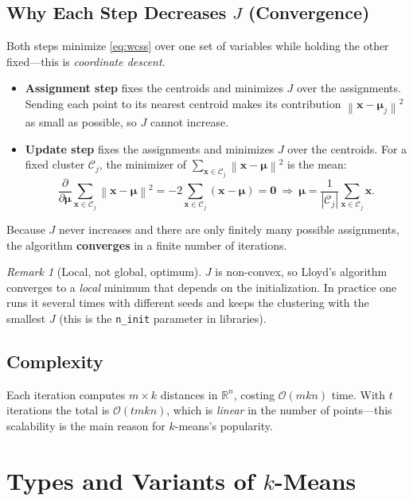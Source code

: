 \documentclass[11pt,a4paper]{report}
\theoremstyle{definition}
\theoremstyle{plain}
\theoremstyle{remark}
\newtheorem*{remark}{Remark}
\newcommand{\R}{\mathbb{R}}
\newcommand{\vx}{\mathbf{x}}
\newcommand{\vmu}{\bm{\mu}}
\newcommand{\C}{\mathcal{C}}
\newcommand{\norm}[1]{\left\lVert #1 \right\rVert}
\begin{document}
	\section{Why Each Step Decreases $J$ (Convergence)}
	Both steps minimize \eqref{eq:wcss} over one set of variables while holding the
	other fixed---this is \emph{coordinate descent}.
	\begin{itemize}[nosep]
		\item \textbf{Assignment step} fixes the centroids and minimizes $J$ over the
		assignments. Sending each point to its nearest centroid makes its
		contribution $\norm{\vx-\vmu_j}^2$ as small as possible, so $J$ cannot
		increase.
		\item \textbf{Update step} fixes the assignments and minimizes $J$ over the
		centroids. For a fixed cluster $\C_j$, the minimizer of
		$\sum_{\vx\in\C_j}\norm{\vx-\vmu}^2$ is the mean:
		\[
		\frac{\partial}{\partial\vmu}\sum_{\vx\in\C_j}\norm{\vx-\vmu}^2
		=-2\sum_{\vx\in\C_j}(\vx-\vmu)=\mathbf 0
		\ \Longrightarrow\ \vmu=\frac{1}{|\C_j|}\sum_{\vx\in\C_j}\vx .
		\]
	\end{itemize}
	Because $J$ never increases and there are only finitely many possible
	assignments, the algorithm \textbf{converges} in a finite number of iterations.
	
	\begin{remark}[Local, not global, optimum]
		$J$ is non-convex, so Lloyd's algorithm converges to a \emph{local} minimum that
		depends on the initialization. In practice one runs it several times with
		different seeds and keeps the clustering with the smallest $J$ (this is the
		\texttt{n\_init} parameter in libraries).
	\end{remark}
	
	\section{Complexity}
	Each iteration computes $m\times k$ distances in $\R^n$, costing
	$\mathcal{O}(mkn)$ time. With $t$ iterations the total is $\mathcal{O}(tmkn)$,
	which is \emph{linear} in the number of points---this scalability is the main
	reason for $k$-means's popularity.
	
	\chapter{Types and Variants of $k$-Means}
	
\end{document}
